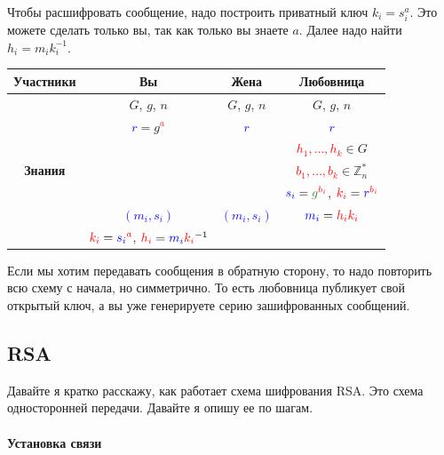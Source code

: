 Чтобы расшифровать сообщение, надо построить приватный ключ $k_i = s_i^a$. Это можете сделать только вы, так как только вы знаете $a$. Далее надо найти $h_i = m_i k_i^{-1}$.
\begin{center}
\begin{tabular}{|c|c|c|c|}
\hline
{\bf Участники}&{Вы}&{Жена}&{Любовница}\\
\hline
\multirow{7}{*}{\bf Знания}&{\textcolor{OliveGreen}{$G$}, \textcolor{OliveGreen}{$g$}, \textcolor{OliveGreen}{$n$}}&{\textcolor{OliveGreen}{$G$}, \textcolor{OliveGreen}{$g$}, \textcolor{OliveGreen}{$n$}}&{\textcolor{OliveGreen}{$G$}, \textcolor{OliveGreen}{$g$}, \textcolor{OliveGreen}{$n$}}\\
{}&{ \textcolor{blue}{$r$}$=$\textcolor{OliveGreen}{$ g$}\textcolor{red}{${}^a$}}&{\textcolor{blue}{$r$}}&{\textcolor{blue}{$r$}}\\
{}&{}&{}&{\textcolor{red}{$h_1,\ldots,h_k$}$\in G$}\\
{}&{}&{}&{\textcolor{red}{$b_1,\ldots,b_k$}$\in \mathbb Z_n^*$}\\
{}&{}&{}&{$\textcolor{blue}{s_i} = \textcolor{OliveGreen}{g}^{\textcolor{red}{b_i}}$, $\textcolor{red}{k_i} = \textcolor{blue}{r}^{\textcolor{red}{b_i}}$}\\
{}&{\textcolor{blue}{$(m_i, s_i)$}}&{\textcolor{blue}{$(m_i, s_i)$}}&{$\textcolor{blue}{m_i} = \textcolor{red}{h_i k_i}$}\\
{}&{$\textcolor{red}{k_i} = \textcolor{blue}{s_i}^{\textcolor{red}{a}}$, $\textcolor{red}{h_i} = \textcolor{blue}{m_i} \textcolor{red}{k_i}^{-1}$}&{}&{}\\
\hline
\end{tabular}
\end{center}

Если мы хотим передавать сообщения в обратную сторону, то надо повторить всю схему с начала, но симметрично. То есть любовница публикует свой открытый ключ, а вы уже генерируете серию зашифрованных сообщений.

\subsection{RSA}

Давайте я кратко расскажу, как работает схема шифрования RSA. Это схема односторонней передачи. Давайте я опишу ее по шагам.

\paragraph{Установка связи}

